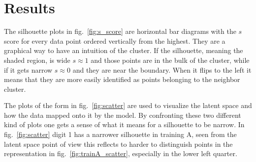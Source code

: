 \documentclass[twocolumn,gsifonts,twoside]{gsipaper}
\begin{document}
\section{Results}
The silhouette plots in fig.~\ref{fig:s_score} are horizontal bar diagrams with the $s$ score for every data point ordered vertically from the highest. They are a graphical way to have an intuition of the cluster. If the silhouette, meaning the shaded region, is wide $s\approx1$ and those points are in the bulk of the cluster, while if it gets narrow $s\approx0$ and they are near the boundary. When it flips to the left it means that they are more easily identified as points belonging to the neighbor cluster.

The plots of the form in fig.~\ref{fig:scatter} are used to visualize the latent space and how the data mapped onto it by the model. By confronting these two different kind of plots one gets a sense of what it means for a silhouette to be narrow. In fig.~\ref{fig:scatter} digit 1 has a narrower silhouette in training A, seen from the latent space point of view this reflects to harder to distinguish points in the representation in fig.~\ref{fig:trainA_scatter}, especially in the lower left quarter.
\end{document}
